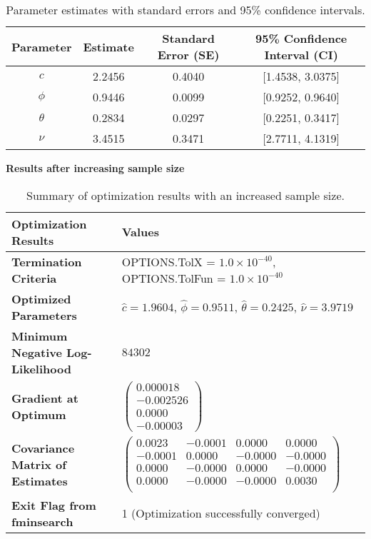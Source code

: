 \documentclass[12pt]{article}
\begin{document}
\begin{table}[h!]
\centering
\begin{tabular}{|c|c|c|c|}
\hline
\textbf{Parameter} & \textbf{Estimate} & \textbf{Standard Error (SE)} & \textbf{95\% Confidence Interval (CI)} \\ \hline
$c$     & 2.2456 & 0.4040 & [1.4538, 3.0375] \\ \hline
$\phi$  & 0.9446 & 0.0099 & [0.9252, 0.9640] \\ \hline
$\theta$ & 0.2834 & 0.0297 & [0.2251, 0.3417] \\ \hline
$\nu$    & 3.4515 & 0.3471 & [2.7711, 4.1319] \\ \hline
\end{tabular}
\caption{Parameter estimates with standard errors and 95\% confidence intervals.}
\label{tab:firstconfidence_intervals}
\end{table}

\textbf{Results after increasing sample size}
\begin{table}[h!]
\centering
\begin{tabular}{|l|l|}
\hline
\textbf{Optimization Results}              & \textbf{Values}                                                                 \\ \hline
\textbf{Termination Criteria}              & OPTIONS.TolX = $1.0 \times 10^{-40}$, OPTIONS.TolFun = $1.0 \times 10^{-40}$     \\ \hline
\textbf{Optimized Parameters}              & $\hat{c} = 1.9604$, $\hat{\phi} = 0.9511$, $\hat{\theta} = 0.2425$, $\hat{\nu} = 3.9719$ \\ \hline
\textbf{Minimum Negative Log-Likelihood}   & $84302$                                                                         \\ \hline
\textbf{Gradient at Optimum}               & $\begin{pmatrix}
0.000018 \\
-0.002526 \\
0.0000 \\
-0.00003
\end{pmatrix}$                                                                  \\ \hline
\textbf{Covariance Matrix of Estimates}    & $\begin{pmatrix}
0.0023 & -0.0001 & 0.0000 & 0.0000 \\
-0.0001 & 0.0000 & -0.0000 & -0.0000 \\
0.0000 & -0.0000 & 0.0000 & -0.0000 \\
0.0000 & -0.0000 & -0.0000 & 0.0030 \\
\end{pmatrix}$                                                                \\ \hline
\textbf{Exit Flag from fminsearch}         & 1 (Optimization successfully converged)                                         \\ \hline
\end{tabular}
\caption{Summary of optimization results with an increased sample size.}
\label{tab:optimization_large_sample}
\end{table}
\end{document}
